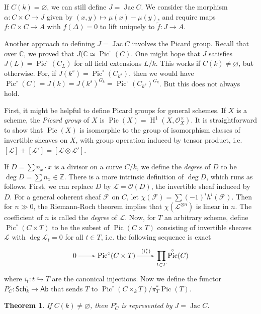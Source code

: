 \documentclass{article}
\DeclareMathOperator{\h}{H}
\DeclareMathOperator{\jac}{Jac}
\DeclareMathOperator{\pic}{Pic}
\newtheorem{theorem}[subsection]{Theorem}
\theoremstyle{definition}
\begin{document}
If $C(k)=\varnothing$, we can still define $J=\jac C$. We consider the 
morphism $\alpha:C\times C\to J$ given by $(x,y)\mapsto \mu(x)-\mu(y)$, 
and require maps $f:C\times C\to A$ with $f(\Delta)=0$ to lift uniquely 
to $\tilde f:J\to A$. 

Another approach to defining $J=\jac C$ involves the Picard group. Recall 
that over $\mathbb{C}$, we proved that $J(\mathbb{C}\simeq\pic^\circ(C)$. 
One might hope that $J$ satisfies $J(L)=\pic^\circ(C_L)$ for all field 
extensions $L/k$. This works if $C(k)\ne\varnothing$, but otherwise. For, 
if $J(k^s)=\pic^\circ(C_{k^s})$, then we would have 
$\pic^\circ(C) = J(k) = J(k^s)^{G_k} = \pic^\circ(C_{k^s})^{G_k}$. But this 
does not always hold. 

First, it might be helpful to define Picard groups for general schemes. If 
$X$ is a scheme, the \emph{Picard group} of $X$ is 
$\pic(X)=\h^1(X,\mathscr{O}_X^\times)$. It is straightforward to show that 
$\pic(X)$ is isomorphic to the group of isomorphism classes of invertible 
sheaves on $X$, with group operation induced by tensor product, i.e. 
$[\mathscr{L}] + [\mathscr{L'}] = [\mathscr{L}\otimes \mathscr{L}']$. 

If $D = \sum n_x\cdot x$ is a divisor on a curve $C/k$, we define the 
\emph{degree} of $D$ to be $\deg D=\sum n_x \in \mathbb{Z}$. There is a more 
intrinsic definition of $\deg D$, which runs as follows. First, we can replace 
$D$ by $\mathscr{L}=\mathscr{O}(D)$, the invertible sheaf induced by $D$. For 
a general coherent sheaf $\mathscr{F}$ on $C$, let 
$\chi(\mathscr{F})=\sum (-1)^i h^i(\mathscr{F})$. Then for $n\gg 0$, the 
Riemann-Roch theorem implies that $\chi(\mathscr{L}^{\otimes n})$ is linear in 
$n$. The coefficient of $n$ is called the \emph{degree} of $\mathscr{L}$. Now, 
for $T$ an arbitrary scheme, define $\pic^\circ(C\times T)$ to be the subset of 
$\pic(C\times T)$ consisting of invertible sheaves $\mathscr{L}$ with 
$\deg\mathscr{L}_t=0$ for all $t\in T$, i.e. the following sequence is exact 
\[\xymatrix{
  0 \ar[r] 
    & \pic^\circ(C\times T) \ar[r]^-{(i_t^*)}
    & \displaystyle\prod_{t\in T} \pic^\circ (C) 
}\]
where $i_t:t\hookrightarrow T$ are the canonical injections. Now we define the 
functor $P_C^\circ:\mathsf{Sch}_k^\circ\to\mathsf{Ab}$ that sends $T$ to 
$\pic^\circ(C\times_k T)/\pi_T^*\pic(T)$. 

\begin{theorem}
If $C(k)\ne \varnothing$, then $P_C^\circ$ is represented by $J=\jac C$.
\end{theorem}
\end{document}
